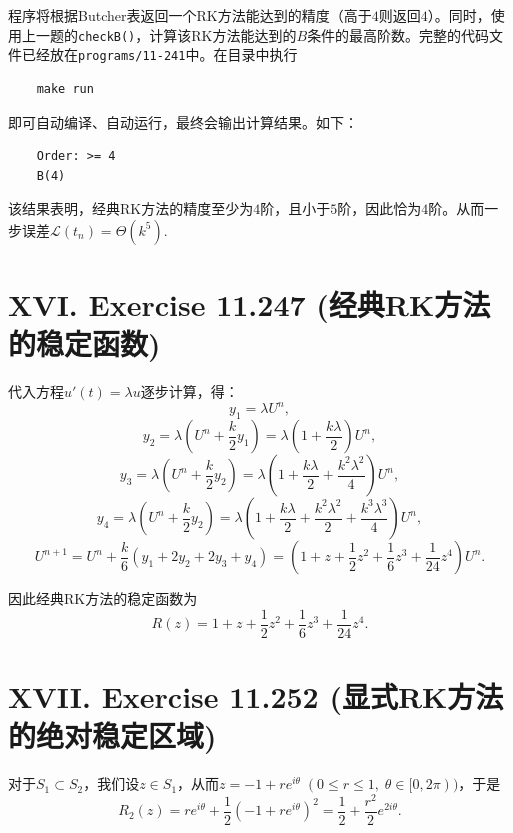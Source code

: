 \documentclass[twoside,a4paper]{article}
\begin{document}
程序将根据Butcher表返回一个RK方法能达到的精度（高于$4$则返回$4$）。同时，使用上一题的\verb|checkB()|，计算该RK方法能达到的$B$条件的最高阶数。完整的代码文件已经放在\verb|programs/11-241|中。在目录中执行
\begin{lstlisting}
    make run
\end{lstlisting}

即可自动编译、自动运行，最终会输出计算结果。如下：
\begin{lstlisting}
    Order: >= 4
    B(4)
\end{lstlisting}

该结果表明，经典RK方法的精度至少为$4$阶，且小于$5$阶，因此恰为$4$阶。从而一步误差$\mathcal{L}(t_n)=\Theta(k^5)$.

\section*{XVI. Exercise 11.247 (经典RK方法的稳定函数)}

\;\;\;\;\;\;代入方程$u'(t)=\lambda u$逐步计算，得：
\begin{equation*}
    y_1=\lambda U^n,
\end{equation*}
\begin{equation*}
    y_2=\lambda (U^n+\frac{k}{2}y_1)=\lambda(1+\frac{k\lambda}{2})U^n,
\end{equation*}
\begin{equation*}
    y_3=\lambda (U^n+\frac{k}{2}y_2)=\lambda(1+\frac{k\lambda}{2}+\frac{k^2\lambda^2}{4})U^n,
\end{equation*}
\begin{equation*}
    y_4=\lambda (U^n+\frac{k}{2}y_2)=\lambda(1+\frac{k\lambda}{2}+\frac{k^2\lambda^2}{2}+\frac{k^3\lambda^3}{4})U^n,
\end{equation*}
\begin{equation*}
    U^{n+1}=U^n+ \frac{k}{6}(y_1+2y_2+2y_3+y_4)=(1+z+\frac{1}{2}z^2+\frac{1}{6}z^3+\frac{1}{24}z^4)U^n.
\end{equation*}

因此经典RK方法的稳定函数为
\begin{equation*}
    R(z)=1+z+\frac{1}{2}z^2+\frac{1}{6}z^3+\frac{1}{24}z^4.
\end{equation*}

\section*{XVII. Exercise 11.252 (显式RK方法的绝对稳定区域)}

\;\;\;\;\;\;对于$S_1\subset S_2$，我们设$z\in S_1$，从而$z=-1+re^{i\theta}\;(0\leq r\leq 1,\;\theta\in[0,2\pi))$，于是
\begin{equation*}
    R_2(z)=re^{i\theta}+\frac{1}{2}(-1+re^{i\theta})^2=\frac{1}{2}+\frac{r^2}{2}e^{2i\theta}.
\end{equation*}
\end{document}
